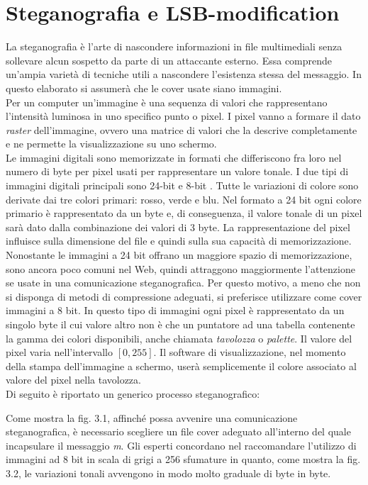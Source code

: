 	\chapter{Steganografia e LSB-modification}
La steganografia è l'arte di nascondere informazioni in file multimediali senza sollevare alcun sospetto da parte di un attaccante esterno. Essa comprende un'ampia varietà di tecniche utili a nascondere l'esistenza stessa del messaggio. In questo elaborato si assumerà che le cover usate siano immagini.\\Per un computer un'immagine è una sequenza di valori che rappresentano l'intensità luminosa in uno specifico punto o pixel. I pixel vanno a formare il dato \textit{raster} dell'immagine, ovvero una matrice di valori che la descrive completamente e ne permette la visualizzazione su uno schermo.\\Le immagini digitali sono memorizzate in formati che differiscono fra loro nel numero di byte per pixel usati per rappresentare un valore tonale. I due tipi di immagini digitali principali sono 24-bit e 8-bit \cite{seeingTheUnseen}. Tutte le variazioni di colore sono derivate dai tre colori primari: rosso, verde e blu. Nel formato a 24 bit ogni colore primario è rappresentato da un byte e, di conseguenza, il valore tonale di un pixel sarà dato dalla combinazione dei valori di 3 byte. La rappresentazione del pixel influisce sulla dimensione del file e quindi sulla sua capacità di memorizzazione. Nonostante le immagini a 24 bit offrano un maggiore spazio di memorizzazione, sono ancora poco comuni nel Web, quindi attraggono maggiormente l'attenzione se usate in una comunicazione steganografica. Per questo motivo, a meno che non si disponga di metodi di compressione adeguati, si preferisce utilizzare come cover immagini a 8 bit. In questo tipo di immagini ogni pixel è rappresentato da un singolo byte il cui valore altro non è che un puntatore ad una tabella contenente la gamma dei colori disponibili, anche chiamata \textit{tavolozza} o \textit{palette}. Il valore del pixel varia nell'intervallo $[0, 255]$. Il software di visualizzazione, nel momento della stampa dell'immagine a schermo, userà semplicemente il colore associato al valore del pixel nella tavolozza.\\
Di seguito è riportato un generico processo steganografico:

Come mostra la fig. 3.1, affinché possa avvenire una comunicazione steganografica, è necessario scegliere un file cover adeguato all'interno del quale incapsulare il messaggio \textit{m}. Gli esperti concordano nel raccomandare l'utilizzo di immagini ad 8 bit in scala di grigi a 256 sfumature \cite{experts} in quanto, come mostra la fig. 3.2, le variazioni tonali avvengono in modo molto graduale di byte in byte.

